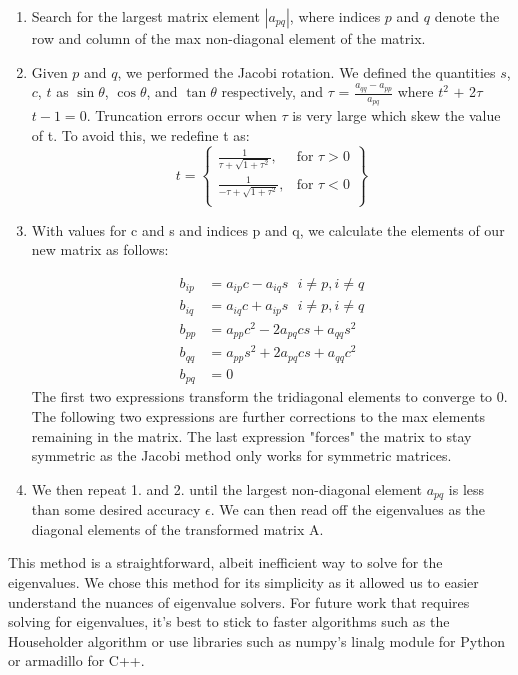 \documentclass{article}
\begin{document}
\begin{enumerate}
	\item Search for the largest matrix element $|a_{pq}|$, where indices $p$ and $q$ denote the row and column of the max non-diagonal element of the matrix.
	\item Given $p$ and $q$, we performed the Jacobi rotation. We defined the quantities
	$s$, $c$, $t$ as $\sin\theta$, $\cos\theta$, and $\tan\theta$ respectively, and  
	$\tau$ =  $ \frac{a_{qq} - a_{pp}}{a_{pq}} $
	where $t^{2}$ $+$ 2$\tau$ $t - 1 = 0$. 
	Truncation errors occur when $\tau$ is very large which skew the value of t. To avoid this, we redefine t as:
	\[
	t = \left\{\begin{array}{lr}
	\frac{1}{\tau+\sqrt{1+\tau^{2}}}, & \text{for } \tau > 0\\
	\frac{1}{-\tau+\sqrt{1+\tau^{2}}}, & \text{for } \tau < 0\\
	\end{array}\right\}
	\]    
    
    \item With values for c and s and indices p and q, we calculate the elements of our new matrix as follows:

\begin{align*}
	b_{ip} &= a_{ip}c - a_{iq}s \ \ \ i \neq p, i \neq q\\
    b_{iq} &= a_{iq}c + a_{ip}s \ \ \ i \neq p, i \neq q \\
    b_{pp} &= a_{pp}c^{2} - 2a_{pq}cs + a_{qq}s^{2}\\ 
    b_{qq} &= a_{pp}s^{2} + 2a_{pq}cs + a_{qq}c^{2}\\
    b_{pq} &= 0
\end{align*}
	The first two expressions transform the tridiagonal elements to converge to 0. The following two expressions are further corrections to the max elements remaining in the matrix. The last expression "forces" the matrix to stay symmetric as the Jacobi method only works for symmetric matrices.
    \item We then repeat 1. and 2. until the largest non-diagonal element $a_{pq}$ is less than some desired accuracy $\epsilon$. We can then read off the eigenvalues as the diagonal elements of the transformed matrix A. 
    

\end{enumerate}
	This method is a straightforward, albeit inefficient way to solve for the eigenvalues. We chose this method for its simplicity as it allowed us to easier understand the nuances of eigenvalue solvers. For future work that requires solving for eigenvalues, it's best to stick to faster algorithms such as the Householder algorithm or use libraries such as numpy's linalg module for Python or armadillo for C++.
\end{document}
